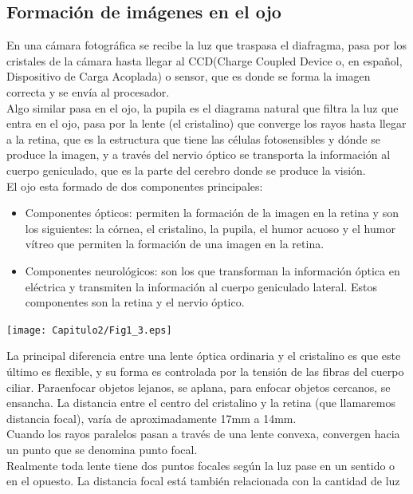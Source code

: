 \subsection{Formación de imágenes en el ojo}
En una cámara fotográfica se recibe la luz que traspasa el diafragma, pasa por los 
cristales de la cámara hasta llegar al CCD(Charge Coupled Device o, en español, 
Dispositivo de Carga Acoplada) o sensor, que es donde se forma la imagen correcta y se 
envía al procesador.\\
Algo similar pasa en el ojo, la pupila es el diagrama natural que filtra la luz que 
entra en el ojo, pasa por la lente (el cristalino)  que converge los rayos hasta 
llegar a la retina, que es la estructura que tiene las células fotosensibles y dónde 
se produce la imagen, y a través del nervio óptico se transporta la información al 
cuerpo geniculado, que es la parte del cerebro donde se produce la visión.\\
El ojo esta formado de dos componentes principales:
\begin{itemize}
\item Componentes ópticos: permiten la formación de la imagen en la retina y son los 
siguientes: la córnea, el cristalino, la pupila, el humor acuoso y el humor vítreo que 
permiten la formación de una imagen en la retina.
\item Componentes neurológicos: son los que transforman la información óptica en 
eléctrica y transmiten la información al cuerpo geniculado lateral. Estos componentes 
son la retina y el nervio óptico.
\end{itemize}
\begin{center}
    \texttt{[image: Capitulo2/Fig1\_3.eps]}       
    \label{Fig1_3}
\end{center}
La principal diferencia entre una lente óptica ordinaria y el cristalino es 
que este último es flexible, y su forma es controlada por la tensión de las 
fibras del cuerpo ciliar. Paraenfocar objetos lejanos, se aplana, para 
enfocar objetos cercanos, se ensancha. La distancia entre el centro del 
cristalino y la retina (que llamaremos distancia focal), varía de 
aproximadamente 17mm a 14mm.~\cite{joseramon2005}\\
Cuando los rayos paralelos pasan a través de una lente convexa, convergen 
hacia un punto que se denomina punto focal.\\
Realmente toda lente tiene dos puntos focales según la luz pase en un sentido o
en el opuesto. La distancia focal está también relacionada con la cantidad de luz
